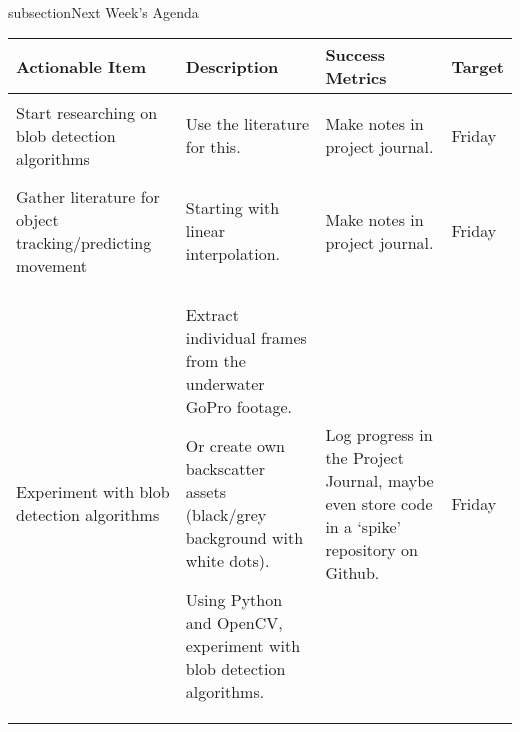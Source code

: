 \\subsection{Next Week's Agenda}

\begin{table}[!h]
    \centering
    \begin{tabularx}{\textwidth}{|X|X|X|l|}
        \hline
        Actionable Item & Description & Success Metrics & Target \\
        \hline
        \hline
        Start researching on blob detection algorithms &
        \begin{myitemize}
            \item Use the literature for this.
        \end{myitemize} &
        \begin{myitemize}
            \item Make notes in project journal.
        \end{myitemize} &
        Friday \\
        \hline
        Gather literature for object tracking/predicting movement &
        \begin{myitemize}
            \item Starting with linear interpolation.
        \end{myitemize} &
        \begin{myitemize}
            \item Make notes in project journal.
        \end{myitemize} &
        Friday \\
        \hline
        Experiment with blob detection algorithms &
        \begin{myitemize}
            \item Extract individual frames from the underwater GoPro footage.
            \item Or create own backscatter assets (black/grey background with white dots).
            \item Using Python and OpenCV, experiment with blob detection algorithms.
        \end{myitemize} &
        \begin{myitemize}
            \item Log progress in the Project Journal, maybe even store code in a `spike' repository on Github.
        \end{myitemize} &
        Friday \\
        \hline
    \end{tabularx}
\end{table}

